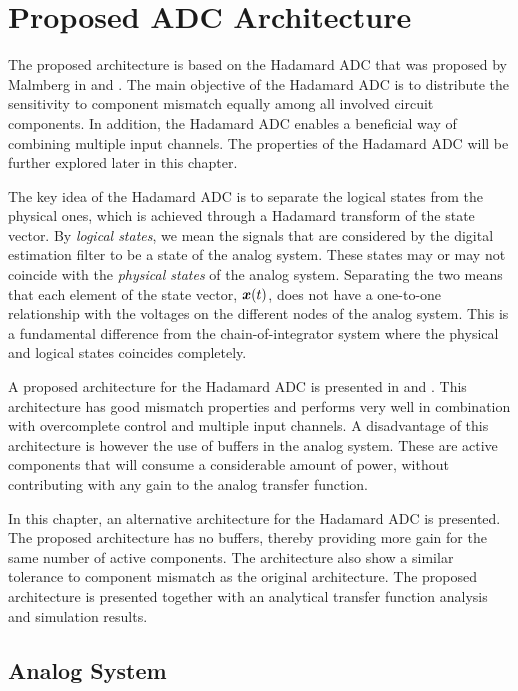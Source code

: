 
\chapter{Proposed ADC Architecture}
\label{sec:HadamardADC}

The proposed architecture is based on the Hadamard ADC that was proposed by Malmberg in \cite{malmberg_thesis} and \cite{malmberg_talk}. The main objective of the Hadamard ADC is to distribute the sensitivity to component mismatch equally among all involved circuit components. In addition, the Hadamard ADC enables a beneficial way of combining multiple input channels. The properties of the Hadamard ADC will be further explored later in this chapter.

The key idea of the Hadamard ADC is to separate the logical states from the physical ones, which is achieved through a Hadamard transform of the state vector. By \textit{logical states}, we mean the signals that are considered by the digital estimation filter to be a state of the analog system. These states may or may not coincide with the \textit{physical states} of the analog system. Separating the two means that each element of the state vector, $\bm{x}(t)$, does not have a one-to-one relationship with the voltages on the different nodes of the analog system. This is a fundamental difference from the chain-of-integrator system where the physical and logical states coincides completely.

A proposed architecture for the Hadamard ADC is presented in \cite{malmberg_thesis} and \cite{malmberg_talk}. This architecture has good mismatch properties and performs very well in combination with overcomplete control and multiple input channels. A disadvantage of this architecture is however the use of buffers in the analog system. These are active components that will consume a considerable amount of power, without contributing with any gain to the analog transfer function.

In this chapter, an alternative architecture for the Hadamard ADC is presented. The proposed architecture has no buffers, thereby providing more gain for the same number of active components. The architecture also show a similar tolerance to component mismatch as the original architecture. The proposed architecture is presented together with an analytical transfer function analysis and simulation results.

\section{Analog System}

